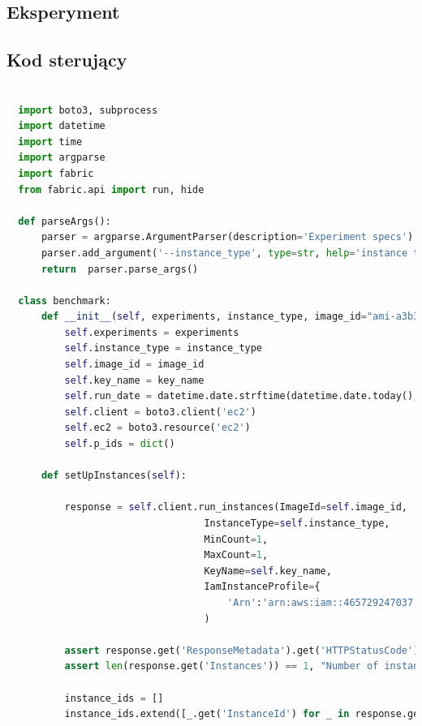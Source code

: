 \documentclass[12pt,a4paper,twoside]{article}
\begin{document}
\listoftables

\clearpage

\begin{appendices}

\section{Eksperyment}

\subsection{Kod sterujący}

\begin{lstlisting}[language=python]

  import boto3, subprocess
  import datetime
  import time
  import argparse
  import fabric
  from fabric.api import run, hide

  def parseArgs():
      parser = argparse.ArgumentParser(description='Experiment specs')
      parser.add_argument('--instance_type', type=str, help='instance type')
      return  parser.parse_args()

  class benchmark:
      def __init__(self, experiments, instance_type, image_id="ami-a3b3d4b5", key_name='dpcld_test1'):
          self.experiments = experiments
          self.instance_type = instance_type
          self.image_id = image_id
          self.key_name = key_name
          self.run_date = datetime.date.strftime(datetime.date.today(), '%Y%m%d')
          self.client = boto3.client('ec2')
          self.ec2 = boto3.resource('ec2')
          self.p_ids = dict()

      def setUpInstances(self):

          response = self.client.run_instances(ImageId=self.image_id,
                                  InstanceType=self.instance_type,
                                  MinCount=1,
                                  MaxCount=1,
                                  KeyName=self.key_name,
                                  IamInstanceProfile={
                                      'Arn':'arn:aws:iam::465729247037:instance-profile/S3_Admin_Access'}
                                  )

          assert response.get('ResponseMetadata').get('HTTPStatusCode') == 200, "Request ended with an error (HTTPStatusCode != 200)"
          assert len(response.get('Instances')) == 1, "Number of instances launched is equal to specified"

          instance_ids = []
          instance_ids.extend([_.get('InstanceId') for _ in response.get('Instances')])


\end{lstlisting}
\end{appendices}
\end{document}
